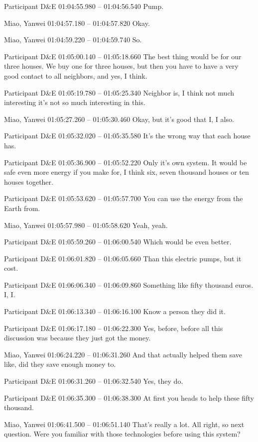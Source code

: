 {Participant D\&E 01:04:55.980 -- 01:04:56.540
Pump.

Miao, Yanwei 01:04:57.180 -- 01:04:57.820
Okay.

Miao, Yanwei 01:04:59.220 -- 01:04:59.740
So.

Participant D\&E 01:05:00.140 -- 01:05:18.660
The best thing would be for our three houses. We buy one for three houses, but then you have to have a very good contact to all neighbors, and yes, I think.

Participant D\&E 01:05:19.780 -- 01:05:25.340
Neighbor is, I think not much interesting it's not so much interesting in this.

Miao, Yanwei 01:05:27.260 -- 01:05:30.460
Okay, but it's good that I, I also.

Participant D\&E 01:05:32.020 -- 01:05:35.580
It's the wrong way that each house has.

Participant D\&E 01:05:36.900 -- 01:05:52.220
Only it's own system. It would be safe even more energy if you make for, I think six, seven thousand houses or ten houses together.

Participant D\&E 01:05:53.620 -- 01:05:57.700
You can use the energy from the Earth from.

Miao, Yanwei 01:05:57.980 -- 01:05:58.620
Yeah, yeah.

Participant D\&E 01:05:59.260 -- 01:06:00.540
Which would be even better.

Participant D\&E 01:06:01.820 -- 01:06:05.660
Than this electric pumps, but it cost.

Participant D\&E 01:06:06.340 -- 01:06:09.860
Something like fifty thousand euros. I, I.

Participant D\&E 01:06:13.340 -- 01:06:16.100
Know a person they did it.

Participant D\&E 01:06:17.180 -- 01:06:22.300
Yes, before, before all this discussion was because they just got the money.

Miao, Yanwei 01:06:24.220 -- 01:06:31.260
And that actually helped them save like, did they save enough money to.

Participant D\&E 01:06:31.260 -- 01:06:32.540
Yes, they do.

Participant D\&E 01:06:35.300 -- 01:06:38.300
At first you heads to help these fifty thousand.

Miao, Yanwei 01:06:41.500 -- 01:06:51.140
That's really a lot. All right, so next question. Were you familiar with those technologies before using this system?

}
